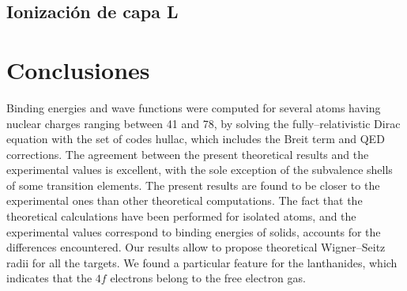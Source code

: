 \subsection{Ionización de capa L}
\label{subsec:results-ionLshell}

\newpage
\section{Conclusiones}
\label{sec:conclu-heavy}

Binding energies and wave functions were computed for several atoms
having nuclear charges ranging between 41 and 78, by solving the
fully--relativistic Dirac equation with the set of codes {\sc hullac}, 
which includes the Breit term and QED corrections. The agreement between 
the present theoretical results and the experimental values is excellent,
with the sole exception of the subvalence shells of some transition
elements. The present results are found to be closer to the experimental 
ones than other theoretical computations. 
The fact that the theoretical calculations have been performed
for isolated atoms, and
the experimental values correspond to binding energies of solids,
accounts for the differences encountered. 
Our results allow to propose theoretical Wigner--Seitz radii for all 
the targets. We found a particular feature for the lanthanides, which
indicates that the $4f$ electrons belong to the free electron gas.


